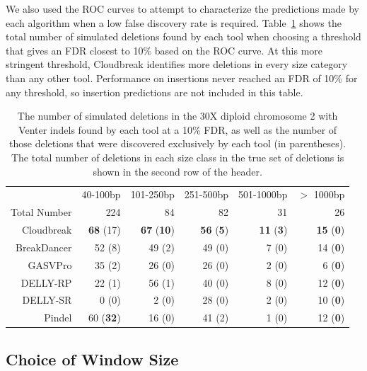 We also used the ROC curves to attempt to characterize the predictions made by each algorithm when a low false discovery rate is required. Table~\ref{chr2DeletionPredsFDR10} shows the total number of simulated deletions found by each tool when choosing a threshold that gives an FDR closest to 10\% based on the ROC curve. At this more stringent threshold, Cloudbreak identifies more deletions in every size category than any other tool. Performance on insertions never reached an FDR of 10\% for any threshold, so insertion predictions are not included in this table. 

\begin{table}
\begin{center}
\begin{tabular}{rrrrrr}
 \hline
 & 40-100bp & 101-250bp & 251-500bp & 501-1000bp & $>$ 1000bp \\ 
 Total Number & 224 & 84 & 82 & 31 & 26\\ 
 \hline
 Cloudbreak & \textbf{68} (17) & \textbf{67} (\textbf{10}) & \textbf{56} (\textbf{5}) & \textbf{11} (\textbf{3}) & \textbf{15} (\textbf{0}) \\ 
 BreakDancer & 52 (8) & 49 (2) & 49 (0) & 7 (0) & 14 (\textbf{0}) \\ 
 GASVPro  & 35 (2) & 26 (0) & 26 (0) & 2 (0) & 6 (\textbf{0}) \\ 
 DELLY-RP  & 22 (1) & 56 (1) & 40 (0) & 8 (0) & 12 (\textbf{0}) \\ 
 DELLY-SR  & 0 (0) & 2 (0) & 28 (0) & 2 (0) & 10 (\textbf{0}) \\ 
 Pindel  & 60 (\textbf{32}) & 16 (0) & 41 (2) & 1 (0) & 12 (\textbf{0})\\ 
 \hline
\end{tabular}
\end{center}
\caption[Deletions and insertions in the simulated data detected at a low false discovery rate.]{The number of simulated deletions in the 30X diploid chromosome 2 with Venter indels found by each tool at a 10\% FDR, as well as the number of those deletions that were discovered exclusively by each tool (in parentheses). The total number of deletions in each size class in the true set of deletions is shown in the second row of the header.}
\label{chr2DeletionPredsFDR10}
\end{table}

\subsection{Choice of Window Size}\label{section_window_size}

